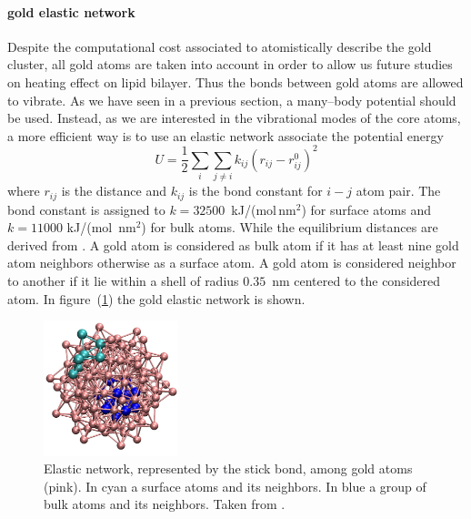 \paragraph{\textbf{gold elastic network}} Despite the computational cost associated to atomistically describe the gold cluster, all gold atoms are taken into account in order to allow us future studies on heating effect on lipid bilayer. Thus the bonds between gold atoms are allowed to vibrate. As we have seen in a previous section, a many--body potential should be used. Instead, as we are interested in the vibrational modes of the core atoms, 
a more efficient way is to use an elastic network associate the potential energy
\begin{equation*}
	U = \frac{1}{2}\sum_i \sum_{j\ne i}k_{ij}(r_{ij} - r_{ij}^0)^2
\end{equation*}
where $r_{ij}$ is the distance and $k_{ij}$ is the bond constant for $i-j$ atom pair. 
The bond constant is assigned to $k = 32500$~kJ/(mol\,nm$^2$) for surface atoms and $k = 11000$ kJ/(mol\ nm$^2$) for bulk atoms. While the equilibrium distances are derived from \cite{clusterEquilibrium}. A gold atom is considered as bulk atom if it has at least nine gold atom neighbors otherwise as a surface atom. A gold atom is considered neighbor to another if it lie within a shell of radius $0.35$~nm centered to the considered atom. In figure~(\ref{fig:goldNetwork}) the gold elastic network is shown.
\begin{figure}
	\centering
	\includegraphics[width=0.35\textwidth]{./img/goldNetwork}
	\caption{Elastic network, represented by the stick bond, among gold atoms (pink). In cyan a surface atoms and its neighbors. In blue a group of bulk atoms and its neighbors. Taken from \cite{simonelliThesis}.}
	\label{fig:goldNetwork}
\end{figure}

